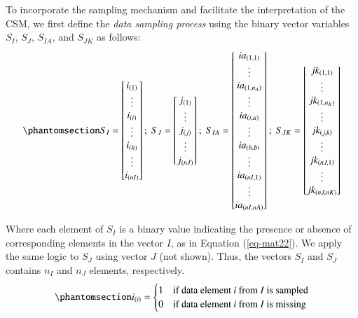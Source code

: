 \documentclass[
  authoryear,
  review,
  1p]{elsarticle}
\begin{document}
To incorporate the sampling mechanism and facilitate the interpretation
of the CSM, we first define the \emph{data sampling process} using the
binary vector variables \(S_{I}\), \(S_{J}\), \(S_{IA}\), and \(S_{JK}\)
as follows: \begin{equation}\phantomsection\label{eq-mat21}{
S_{I} = \begin{bmatrix}
i_{(1)} \\
\vdots \\
i_{(i)} \\
\vdots \\
i_{(h)} \\
\vdots \\
i_{(nI)}
\end{bmatrix} ; \;
S_{J} = \begin{bmatrix}
j_{(1)} \\
\vdots \\
j_{(j)} \\
\vdots \\
j_{(nJ)}
\end{bmatrix} ; \;
S_{IA} = \begin{bmatrix}
ia_{(1,1)} \\
\vdots \\
ia_{(1,n_{A})} \\
\vdots \\
ia_{(i,a)} \\
\vdots \\
ia_{(h,b)} \\
\vdots \\
ia_{(nI,1)} \\
\vdots \\
ia_{(nI,nA)}
\end{bmatrix} ; \;
S_{JK} = \begin{bmatrix}
jk_{(1,1)} \\
\vdots \\
jk_{(1,n_{K})} \\
\vdots \\
jk_{(j,k)} \\
\vdots \\
jk_{(nJ,1)} \\
\vdots \\
jk_{(nJ,nK)}
\end{bmatrix}
}\end{equation}

Where each element of \(S_{I}\) is a binary value indicating the
presence or absence of corresponding elements in the vector \(I\), as in
Equation (\ref{eq-mat22}). We apply the same logic to \(S_{J}\) using
vector \(J\) (not shown). Thus, the vectors \(S_{I}\) and \(S_{J}\)
contains \(n_{I}\) and \(n_{J}\) elements, respectively.
\begin{equation}\phantomsection\label{eq-mat22}{
i_{(i)} = \begin{cases} 
1 & \text{if data element } i \text{ from } I \text{ is sampled} \\
0 & \text{if data element } i \text{ from } I \text{ is missing}
\end{cases}
}\end{equation}
\end{document}
